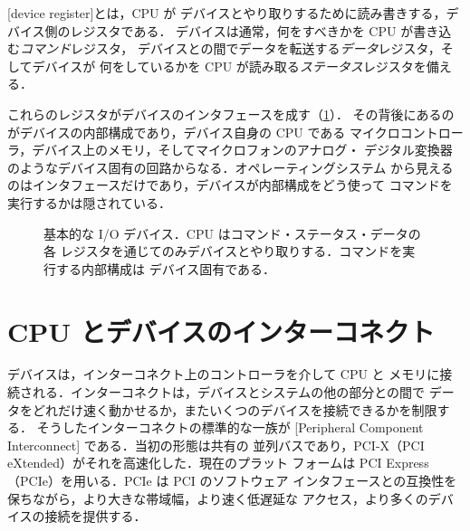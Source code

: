 \documentclass[../main.tex]{subfiles}
\begin{document}
\begin{definition}[デバイスレジスタ]
  [device register]とは，CPU が
  デバイスとやり取りするために読み書きする，デバイス側のレジスタである．
  デバイスは通常，何をすべきかを CPU が書き込む\emph{コマンド}レジスタ，
  デバイスとの間でデータを転送する\emph{データ}レジスタ，そしてデバイスが
  何をしているかを CPU が読み取る\emph{ステータス}レジスタを備える．
\end{definition}

これらのレジスタがデバイスのインタフェースを成す（\cref{fig:l11-device}）．%
%
その背後にあるのがデバイスの内部構成であり，デバイス自身の CPU である
マイクロコントローラ，デバイス上のメモリ，そしてマイクロフォンのアナログ・
デジタル変換器のようなデバイス固有の回路からなる．オペレーティングシステム
から見えるのはインタフェースだけであり，デバイスが内部構成をどう使って
コマンドを実行するかは隠されている．

\begin{figure}[htbp]
  \centering
  
  \caption{基本的な I/O デバイス．CPU はコマンド・ステータス・データの各
    レジスタを通じてのみデバイスとやり取りする．コマンドを実行する内部構成は
    デバイス固有である．}
  \label{fig:l11-device}
\end{figure}

\section{CPU とデバイスのインターコネクト}
\label{sec:l11-interconnect}

デバイスは，インターコネクト上のコントローラを介して CPU と
メモリに接続される．インターコネクトは，デバイスとシステムの他の部分との間で
データをどれだけ速く動かせるか，またいくつのデバイスを接続できるかを制限する．
そうしたインターコネクトの標準的な一族が
[Peripheral Component Interconnect]%
 である．当初の形態は共有の
並列バスであり，PCI-X（PCI eXtended）がそれを高速化した．現在のプラット
フォームは PCI Express（PCIe）を用いる．PCIe は PCI のソフトウェア
インタフェースとの互換性を保ちながら，より大きな帯域幅，より速く低遅延な
アクセス，より多くのデバイスの接続を提供する．
\end{document}
